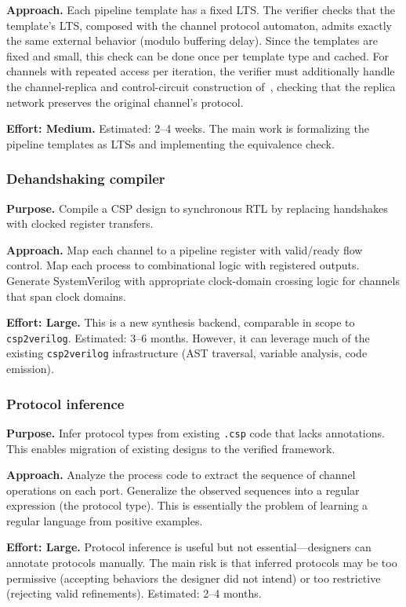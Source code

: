 \documentclass[11pt]{article}
\begin{document}
\textbf{Approach.}  Each pipeline template has a fixed LTS.  The
verifier checks that the template's LTS, composed with the channel
protocol automaton, admits exactly the same external behavior (modulo
buffering delay).  Since the templates are fixed and small, this
check can be done once per template type and cached.  For channels
with repeated access per iteration, the verifier must additionally
handle the channel-replica and control-circuit construction
of~\cite{wen2025}, checking that the replica network preserves the
original channel's protocol.

\textbf{Effort: Medium.}  Estimated: 2--4 weeks.  The main work is
formalizing the pipeline templates as LTSs and implementing the
equivalence check.

\subsubsection{Dehandshaking compiler}

\textbf{Purpose.} Compile a CSP design to synchronous RTL by
replacing handshakes with clocked register transfers.

\textbf{Approach.}  Map each channel to a pipeline register with
valid/ready flow control.  Map each process to combinational logic
with registered outputs.  Generate SystemVerilog with appropriate
clock-domain crossing logic for channels that span clock domains.

\textbf{Effort: Large.}  This is a new synthesis backend, comparable
in scope to \texttt{csp2verilog}.  Estimated: 3--6 months.  However,
it can leverage much of the existing \texttt{csp2verilog}
infrastructure (AST traversal, variable analysis, code emission).

\subsubsection{Protocol inference}

\textbf{Purpose.} Infer protocol types from existing \texttt{.csp}
code that lacks annotations.  This enables migration of existing
designs to the verified framework.

\textbf{Approach.} Analyze the process code to extract the sequence
of channel operations on each port.  Generalize the observed sequences
into a regular expression (the protocol type).  This is essentially
the problem of learning a regular language from positive examples.

\textbf{Effort: Large.}  Protocol inference is useful but not
essential---designers can annotate protocols manually.  The main
risk is that inferred protocols may be too permissive (accepting
behaviors the designer did not intend) or too restrictive (rejecting
valid refinements).  Estimated: 2--4 months.
\end{document}
